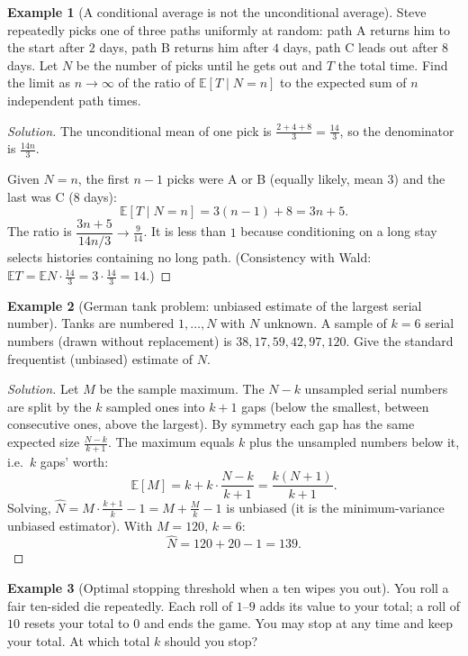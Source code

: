 \documentclass[11pt]{article}
\theoremstyle{definition}
\newtheorem{example}{Example}[section]
\newcommand{\E}{\mathbb{E}}
\begin{document}
\begin{example}[A conditional average is not the unconditional average]
Steve repeatedly picks one of three paths uniformly at random: path A returns him to the start after $2$ days, path B returns him after $4$ days, path C leads out after $8$ days. Let $N$ be the number of picks until he gets out and $T$ the total time. Find the limit as $n\to\infty$ of the ratio of $\E[T\mid N=n]$ to the expected sum of $n$ independent path times.
\end{example}

\begin{proof}[Solution]
The unconditional mean of one pick is $\tfrac{2+4+8}3=\tfrac{14}3$, so the denominator is $\tfrac{14n}3$.

Given $N=n$, the first $n-1$ picks were A or B (equally likely, mean $3$) and the last was C ($8$ days):
\[
\E[T\mid N=n]=3(n-1)+8=3n+5 .
\]
The ratio is $\dfrac{3n+5}{14n/3}\to\boxed{\tfrac9{14}}$. It is less than $1$ because conditioning on a long stay selects histories containing no long path. (Consistency with Wald: $\E T=\E N\cdot\tfrac{14}3=3\cdot\tfrac{14}3=14$.)
\end{proof}

\begin{example}[German tank problem: unbiased estimate of the largest serial number]
Tanks are numbered $1,\dots,N$ with $N$ unknown. A sample of $k=6$ serial numbers (drawn without replacement) is $38,17,59,42,97,120$. Give the standard frequentist (unbiased) estimate of $N$.
\end{example}

\begin{proof}[Solution]
Let $M$ be the sample maximum. The $N-k$ unsampled serial numbers are split by the $k$ sampled ones into $k+1$ gaps (below the smallest, between consecutive ones, above the largest). By symmetry each gap has the same expected size $\tfrac{N-k}{k+1}$. The maximum equals $k$ plus the unsampled numbers below it, i.e.\ $k$ gaps' worth:
\[
\E[M]=k+k\cdot\frac{N-k}{k+1}=\frac{k(N+1)}{k+1}.
\]
Solving, $\hat N=M\cdot\frac{k+1}{k}-1=M+\frac Mk-1$ is unbiased (it is the minimum-variance unbiased estimator). With $M=120$, $k=6$:
\[
\hat N=120+20-1=\boxed{139}.
\]
\end{proof}

\begin{example}[Optimal stopping threshold when a ten wipes you out]
You roll a fair ten-sided die repeatedly. Each roll of $1$--$9$ adds its value to your total; a roll of $10$ resets your total to $0$ and ends the game. You may stop at any time and keep your total. At which total $k$ should you stop?
\end{example}
\end{document}
